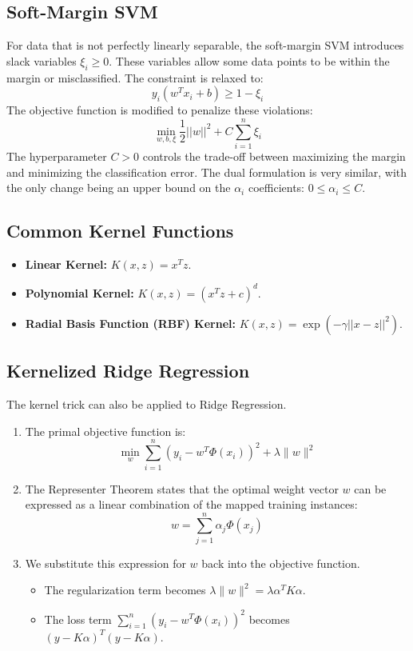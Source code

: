 \documentclass{article}
\begin{document}
\begin{multicols}{2}
\subsection{Soft-Margin SVM}
For data that is not perfectly linearly separable, the soft-margin SVM introduces slack variables $\xi_i \ge 0$. These variables allow some data points to be within the margin or misclassified. The constraint is relaxed to:
$$ y_i(w^T x_i + b) \ge 1 - \xi_i $$
The objective function is modified to penalize these violations:
$$ \min_{w, b, \xi} \frac{1}{2}||w||^2 + C \sum_{i=1}^{n} \xi_i $$
The hyperparameter $C > 0$ controls the trade-off between maximizing the margin and minimizing the classification error. The dual formulation is very similar, with the only change being an upper bound on the $\alpha_i$ coefficients: $0 \le \alpha_i \le C$.

\subsection{Common Kernel Functions}
\begin{itemize}
    \item \textbf{Linear Kernel:} $K(x, z) = x^T z$.
    \item \textbf{Polynomial Kernel:} $K(x, z) = (x^T z + c)^d$.
    \item \textbf{Radial Basis Function (RBF) Kernel:} $K(x, z) = \exp(-\gamma ||x - z||^2)$.
\end{itemize}

\subsection{Kernelized Ridge Regression}
The kernel trick can also be applied to Ridge Regression.

\begin{enumerate}
    \item The primal objective function is:
    \[
    \min_{w} \sum_{i=1}^{n} (y_i - w^T \Phi(x_i))^2 + \lambda \|w\|^2
    \]
    
    \item The Representer Theorem states that the optimal weight vector $w$ can be expressed as a linear combination of the mapped training instances:
    \[
    w = \sum_{j=1}^{n} \alpha_j \Phi(x_j)
    \]

    \item We substitute this expression for $w$ back into the objective function.
    \begin{itemize}
        \item The regularization term becomes $\lambda \|w\|^2 = \lambda \alpha^T K \alpha$.
        \item The loss term $\sum_{i=1}^{n}(y_i - w^T\Phi(x_i))^2$ becomes $(y - K\alpha)^T (y - K\alpha)$.
    \end{itemize}


\end{enumerate}
\end{multicols}
\end{document}
